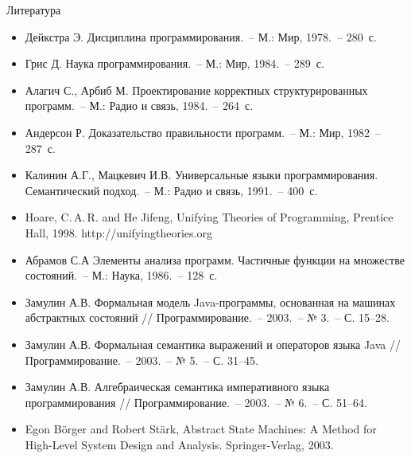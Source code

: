 \documentclass[landscape]{slides}
\begin{document}
\begin{slide}
Литература
\begin{itemize}
\item Дейкстра Э. Дисциплина программирования.~-- М.: Мир, 1978.~-- 280~с.
\item Грис Д. Наука программирования.~-- М.: Мир, 1984.~-- 289~с.
\item Алагич С., Арбиб М. Проектирование корректных структурированных программ.~-- М.: Радио и связь, 1984.~-- 264~с.
\item Андерсон Р. Доказательство правильности программ.~-- М.: Мир, 1982~-- 287~с.
\item Калинин А.Г., Мацкевич И.В. Универсальные языки программирования. Семантический подход.~-- М.: Радио и связь, 1991.~-- 400~с.
\item Hoare, C.\,A.\,R. and He Jifeng, Unifying Theories of Programming, Prentice Hall, 1998. http://unifyingtheories.org
\end{itemize}
\end{slide}

\begin{slide}
\begin{itemize}
\item Абрамов С.А  Элементы анализа программ. Частичные функции на множестве состояний.~-- М.: Наука, 1986.~-- 128~с.
\item Замулин А.В. Формальная модель Java-программы, основанная на машинах абстрактных состояний // Программирование.~-- 2003.~-- № 3.~-- С. 15–28.
\item Замулин А.В. Формальная семантика выражений и операторов языка Java // Программирование.~-- 2003.~-- № 5.~-- С. 31–45.
\item Замулин А.В. Алгебраическая семантика императивного языка программирования // Программирование.~-- 2003.~-- № 6.~-- С. 51–64.
\item Egon Börger and Robert Stärk, Abstract State Machines: A Method for High-Level System Design and Analysis. Springer-Verlag, 2003.
\end{itemize}
\end{slide}
\end{document}
